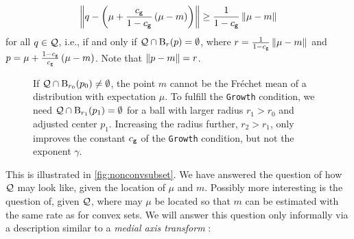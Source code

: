 	\begin{equation*}
		\left\Vert q-\left( \mu+\frac{c_{\mathsf{g}}}{1-c_{\mathsf{g}}} \left( \mu-m \right) \right) \right\Vert \geq \frac{1}{1-c_{\mathsf{g}}} \left\Vert \mu-m \right\Vert
	\end{equation*}
	for all $q\in\mathcal{Q}$, i.e., if and only if $\mathcal{Q} \cap \operatorname{\mathrm{B}}_{r}(p) = \emptyset$, where $r= \frac{1}{1-c_{\mathsf{g}}} \left\Vert \mu-m \right\Vert$ and $p=\mu+\frac{1-c_{\mathsf{g}}}{c_{\mathsf{g}}} \left( \mu-m \right)$.  Note that $\Vert p-m \Vert = r$.
	\begin{figure}
	\begin{center}
	\end{center}
	\caption{If $\mathcal{Q} \cap \operatorname{\mathrm{B}}_{r_0}(p_0) \neq \emptyset$, the point $m$ cannot be the Fréchet mean of a distribution with expectation $\mu$. To fulfill the 
	\texttt{Growth}
	condition, we need $\mathcal{Q} \cap \operatorname{\mathrm{B}}_{r_1}(p_1) = \emptyset$ for a ball with larger radius $r_1 > r_0$ and adjusted center $p_1$. Increasing the radius further, $r_2>r_1$, only improves the constant $c_{\mathsf{g}}$ of the 
	\texttt{Growth}
	condition, but not the exponent $\gamma$.
	}\label{fig:nonconvsubset}
	\end{figure}
	This is illustrated in \autoref{fig:nonconvsubset}.
	We have answered the question of how $\mathcal{Q}$ may look like, given the location of $\mu$ and $m$. Possibly more interesting is the question of, given $\mathcal{Q}$, where may $\mu$ be located so that $m$ can be estimated with the same rate as for convex sets. We will answer this question only informally via a description similar to a \textit{medial axis transform} \cite{choi97}:
	
